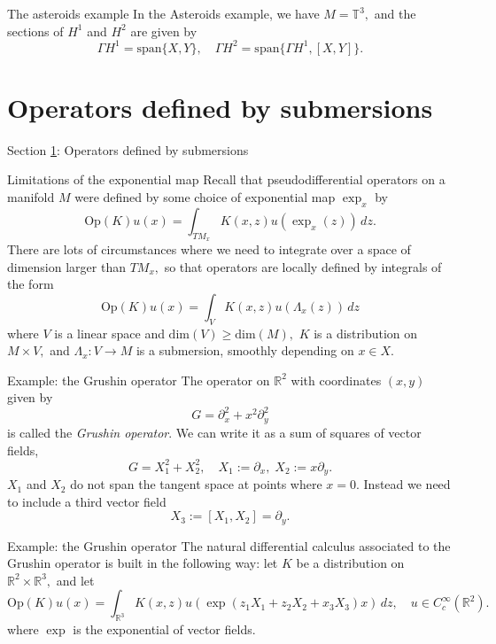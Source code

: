 \documentclass{beamer}
\numberwithin{equation}{section}
\theoremstyle{plain}
\theoremstyle{plain}
\theoremstyle{definition}
\theoremstyle{plain}
\theoremstyle{plain}
\theoremstyle{definition}
\newcommand{\Rl}{\mathbb{R}}
\newcommand{\Circ}{\mathbb{T}}
\newcommand{\Op}{\mathrm{Op}}
\begin{document}
\begin{frame}{The asteroids example}
  In the Asteroids example, we have $M=\Circ^3,$ and the sections of $H^1$ and $H^2$ are given by
  \[
    \Gamma H^1 = \mathrm{span}\{X,Y\},\quad \Gamma H^2 = \mathrm{span}\{\Gamma H^1, [X,Y]\}.
  \]
\end{frame}

\section{Operators defined by submersions}\label{submersion_section}

\begin{frame}
    \huge{Section \ref{submersion_section}: Operators defined by submersions}
\end{frame}

\begin{frame}{Limitations of the exponential map}
    Recall that pseudodifferential operators on a manifold $M$ were defined by some choice of exponential map $\exp_x$ by 
    \[
        \Op(K)u(x) = \int_{TM_x} K(x,z)u(\exp_x(z))\,dz.
    \]
    There are lots of circumstances where we need to integrate over a space of dimension larger than $TM_x,$ so that operators are locally defined by integrals of the form
    \[
        \Op(K)u(x) = \int_V K(x,z)u(\Lambda_x(z))\,dz
    \]
    where $V$ is a linear space and $\mathrm{dim}(V)\geq \mathrm{dim}(M),$ $K$ is a distribution on $M\times V,$ and $\Lambda_x:V\to M$ is a submersion, smoothly depending on $x \in X.$   
\end{frame}

\begin{frame}{Example: the Grushin operator}
    The operator on $\Rl^2$ with coordinates $(x,y)$ given by
    \[
        G = \partial_x^2+x^2\partial_y^2
    \]
    is called the \emph{Grushin operator}. We can write it as a sum of squares of vector fields,
    \[
        G = X_1^2+X_2^2,\quad X_1 := \partial_x,\; X_2 := x\partial_y.
    \]
    $X_1$ and $X_2$ do not span the tangent space at points where $x=0.$ Instead we need to include a third vector field
    \[
        X_3 := [X_1,X_2] = \partial_y.
    \]
\end{frame}

\begin{frame}{Example: the Grushin operator}
    The natural differential calculus associated to the Grushin operator is built in the following way: let $K$ be a distribution on $\Rl^2\times \Rl^3,$ and let
    \[
        \Op(K)u(x) = \int_{\Rl^3} K(x,z)u(\exp(z_1X_1+z_2X_2+x_3X_3)x)\,dz,\quad u\in C^\infty_c(\Rl^2).
    \]
    where $\exp$ is the exponential of vector fields.
\end{frame}
\end{document}

